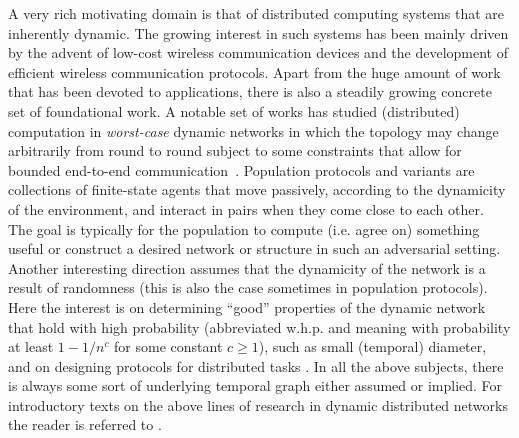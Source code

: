 \documentclass[oribibl, 11pt]{llncs}
\begin{document}
A very rich motivating domain is that of distributed computing systems that are inherently dynamic. The growing interest in such systems has been mainly driven by the advent of low-cost wireless communication devices and the development of efficient wireless communication protocols. Apart from the huge amount of work that has been devoted to applications, there is also a steadily growing concrete set of foundational work. A notable set of works has studied (distributed) computation in \emph{worst-case} dynamic networks in which the topology may change arbitrarily from round to round subject to some constraints that allow for bounded end-to-end communication~\cite{OW05,KLO10,MCS14,MCS13b,DPRS13,APRU12}. Population protocols \cite{AADFP06} and variants \cite{MCS11-2,MS14b} are collections of finite-state agents that move passively, according to the dynamicity of the environment, and interact in pairs when they come close to each other. The goal is typically for the population to compute (i.e. agree on) something useful or construct a desired network or structure in such an adversarial setting. Another interesting direction assumes that the dynamicity of the network is a result of randomness (this is also the case sometimes in population protocols). Here the interest is on determining ``good'' properties of the dynamic network that hold with high probability (abbreviated w.h.p. and meaning with probability at least $1-1/n^c$ for some constant $c\geq 1$), such as small (temporal) diameter, and on designing protocols for distributed tasks \cite{CFTE08,AKL08}. In all the above subjects, there is always some sort of underlying temporal graph either assumed or implied. For introductory texts on the above lines of research in dynamic distributed networks the reader is referred to \cite{CFQS12,MCS11,Sc02,KO11}.
\end{document}
